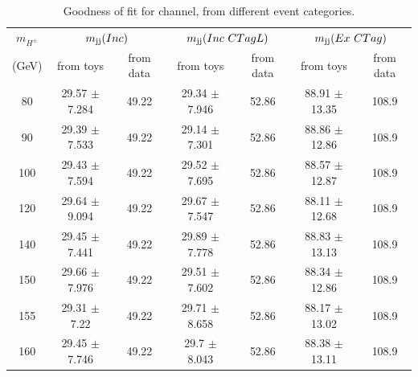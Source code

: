 \begin{table}
\caption{Goodness of fit for \mujets channel, from different event categories.}
\label{tab:gofMu}
\centering
\begin{adjustbox}{max width=\textwidth}
\begin{tabular}{ ccccccc}
\hline
\hline
\multicolumn{1}{c}{{\bf{$m_{H^\pm}$}}} & \multicolumn{2}{c}{$m_\text{jj}(Inc)$} & \multicolumn{2}{c}{$m_\text{jj}(Inc ~CTagL)$} & \multicolumn{2}{c}{$m_\text{jj}(Ex ~CTag)$} \\

(GeV) & from toys & from data & from toys & from data & from toys & from data  \\
 \hline
\hline
80  & 29.57 $\pm$ 7.284 & 49.22 & 29.34 $\pm$ 7.946 & 52.86 & 88.91 $\pm$ 13.35 & 108.9\\
  
90  & 29.39 $\pm$ 7.533 & 49.22 & 29.14 $\pm$ 7.301 & 52.86 & 88.86 $\pm$ 12.86 & 108.9\\
  
100  & 29.43 $\pm$ 7.594 & 49.22 & 29.52 $\pm$ 7.695 & 52.86 & 88.57 $\pm$ 12.87 & 108.9\\
  
120  & 29.64 $\pm$ 9.094 & 49.22 & 29.67 $\pm$ 7.547 & 52.86 & 88.11 $\pm$ 12.68 & 108.9\\
  
140  & 29.45 $\pm$ 7.441 & 49.22 & 29.89 $\pm$ 7.778 & 52.86 & 88.83 $\pm$ 13.13 & 108.9\\
  
150  & 29.66 $\pm$ 7.976 & 49.22 & 29.51 $\pm$ 7.602 & 52.86 & 88.34 $\pm$ 12.86 & 108.9\\
  
155  & 29.31 $\pm$ 7.22 & 49.22 & 29.71 $\pm$ 8.658 & 52.86 & 88.17 $\pm$ 13.02 & 108.9\\
  
160  & 29.45 $\pm$ 7.746 & 49.22 & 29.7 $\pm$ 8.043 & 52.86 & 88.38 $\pm$ 13.11 & 108.9\\
\hline
\end{tabular}
\end{adjustbox}
\end{table}

